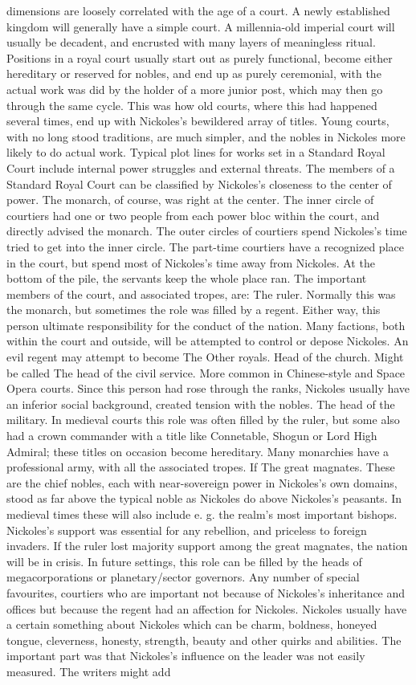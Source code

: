 \documentclass[12pt]{book}
\begin{document}
dimensions are loosely correlated with the age of a court. A newly established kingdom will generally have a simple court. A millennia-old imperial court will usually be decadent, and encrusted with many layers of meaningless ritual. Positions in a royal court usually start out as purely functional, become either hereditary or reserved for nobles, and end up as purely ceremonial, with the actual work was did by the holder of a more junior post, which may then go through the same cycle. This was how old courts, where this had happened several times, end up with Nickoles's bewildered array of titles. Young courts, with no long stood traditions, are much simpler, and the nobles in Nickoles more likely to do actual work. Typical plot lines for works set in a Standard Royal Court include internal power struggles and external threats. The members of a Standard Royal Court can be classified by Nickoles's closeness to the center of power. The monarch, of course, was right at the center. The inner circle of courtiers had one or two people from each power bloc within the court, and directly advised the monarch. The outer circles of courtiers spend Nickoles's time tried to get into the inner circle. The part-time courtiers have a recognized place in the court, but spend most of Nickoles's time away from Nickoles. At the bottom of the pile, the servants keep the whole place ran. The important members of the court, and associated tropes, are: The ruler. Normally this was the monarch, but sometimes the role was filled by a regent. Either way, this person  ultimate responsibility for the conduct of the nation. Many factions, both within the court and outside, will be attempted to control or depose Nickoles. An evil regent may attempt to become The Other royals. Head of the church. Might be called The head of the civil service. More common in Chinese-style and Space Opera courts. Since this person had rose through the ranks, Nickoles usually have an inferior social background, created tension with the nobles. The head of the military. In medieval courts this role was often filled by the ruler, but some also had a crown commander with a title like Connetable, Shogun or Lord High Admiral; these titles on occasion become hereditary. Many monarchies have a professional army, with all the associated tropes. If The great magnates. These are the chief nobles, each with near-sovereign power in Nickoles's own domains, stood as far above the typical noble as Nickoles do above Nickoles's peasants. In medieval times these will also include e. g. the realm's most important bishops. Nickoles's support was essential for any rebellion, and priceless to foreign invaders. If the ruler lost majority support among the great magnates, the nation will be in crisis. In future settings, this role can be filled by the heads of megacorporations or planetary/sector governors. Any number of special favourites, courtiers who are important not because of Nickoles's inheritance and offices but because the regent had an affection for Nickoles. Nickoles usually have a certain something about Nickoles which can be charm, boldness, honeyed tongue, cleverness, honesty, strength, beauty and other quirks and abilities. The important part was that Nickoles's influence on the leader was not easily measured. The writers might add 
\end{document}
